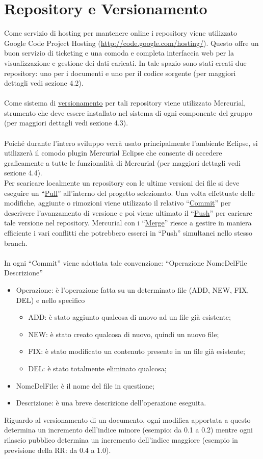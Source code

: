 \chapter{Repository e Versionamento}
\thispagestyle{fancy}
Come servizio di hosting per mantenere online i repository
viene utilizzato Google Code Project Hosting
(\url{http://code.google.com/hosting/}). Questo offre un buon
servizio di ticketing e una comoda e completa interfaccia web per
la visualizzazione e gestione dei dati caricati. In tale spazio sono
stati creati due repository: uno per i documenti e uno per il codice sorgente
(per maggiori dettagli vedi sezione 4.2). 
\\ \\
Come sistema di
\underline{versionamento} per tali repository viene utilizzato Mercurial,
strumento che deve essere installato nel sistema di ogni componente del gruppo
(per maggiori dettagli vedi sezione 4.3).
\\ \\
Poich\'e durante l'intero sviluppo verr\`a usato principalmente l'ambiente
Eclipse, si utilizzer\`a il comodo plugin Mercurial Eclipse che consente di accedere
graficamente a tutte le funzionalit\`a di Mercurial (per maggiori dettagli vedi
sezione 4.4). 
\\
Per scaricare localmente un repository con le ultime versioni dei
file si deve eseguire un ``\underline{Pull}'' all'interno del progetto
selezionato. Una volta effettuate delle modifiche, aggiunte o rimozioni viene
utilizzato il relativo ``\underline{Commit}'' per descrivere l'avanzamento di
versione e poi viene ultimato il ``\underline{Push}'' per caricare tale versione
nel repository. Mercurial con i ``\underline{Merge}'' riesce a gestire in maniera efficiente i vari conflitti
che potrebbero esserci in ``Push'' simultanei nello stesso branch.\\ 
\\
In ogni ``Commit'' viene adottata tale convenzione: 
``Operazione NomeDelFile Descrizione''
\begin{itemize}
\item {Operazione: \`e l'operazione fatta su un determinato file (ADD, NEW, FIX,
DEL) e nello specifico}
\begin {itemize}
\item {ADD: \`e stato aggiunto qualcosa di nuovo ad un file gi\`a esistente;}
\item {NEW: \`e stato creato qualcosa di nuovo, quindi un nuovo file;} 
\item {FIX: \`e stato modificato un contenuto presente in un file gi\`a
esistente;} 
\item {DEL: \`e stato totalmente eliminato qualcosa;}
\end {itemize}
\item {NomeDelFile: \`e il nome del file in questione;}
\item {Descrizione: \`e una breve descrizione dell'operazione eseguita.}
\end{itemize}
Riguardo al versionamento di un documento, ogni modifica apportata a questo
determina un incremento dell'indice minore (esempio: da 0.1 a 0.2) mentre ogni
rilascio pubblico determina un incremento dell'indice maggiore (esempio in
previsione della RR: da 0.4 a 1.0).


